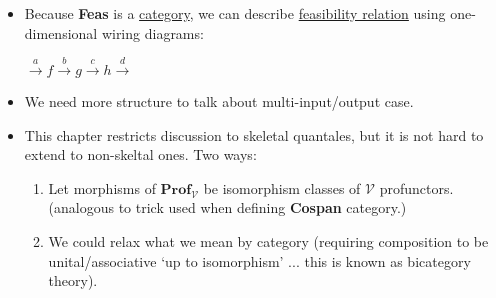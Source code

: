 \begin{itemize}
    \item Because \textbf{Feas} is a \href{doc/1 math/Seven Sketches in Compositionality/Chapter 4: Co-design/3 Categories of profunctors/2 The categories V-Prof and Feas/1 V-profunctor category}{category}, we can describe \href{doc/1 math/Seven Sketches in Compositionality/Chapter 4: Co-design/2 Enriched profunctors/1 Feasibility relationships as Bool-profunctors/1 Feasilibiliy relation}{feasibility relation} using one-dimensional wiring diagrams:

          $\xrightarrow{a}\boxed{f}\xrightarrow{b}\boxed{g}\xrightarrow{c}\boxed{h}\xrightarrow{d}$
    \item We need more structure to talk about multi-input/output case.
    \item This chapter restricts discussion to skeletal quantales, but it is not hard to extend to non-skeltal ones. Two ways:
          \begin{enumerate}
            \item Let morphisms of $\mathbf{Prof}_\mathcal{V}$ be isomorphism classes of $\mathcal{V}$ profunctors. (analogous to trick used when defining \textbf{Cospan} category.)
            \item We could relax what we mean by category (requiring composition to be unital/associative `up to isomorphism' ... this is known as bicategory theory).
          \end{enumerate}
  \end{itemize}
